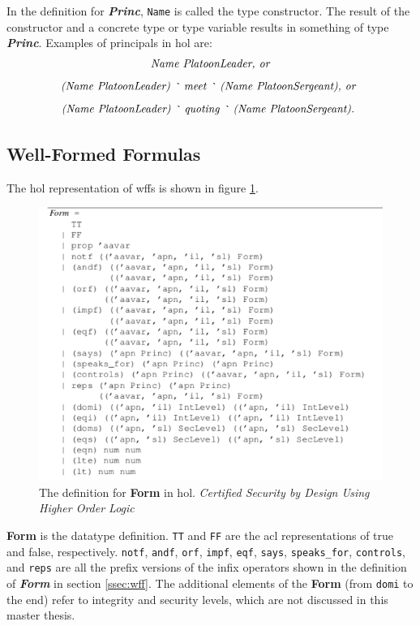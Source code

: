 \documentclass[../../main/main.tex]{subfiles}
\begin{document}
In the definition for  \textbf{\textit{Princ}}, \texttt{Name} is called the type constructor.  The result of the constructor and a concrete type or type variable results in something of type \textbf{\textit{Princ}}.  Examples of principals in \gls{hol} are:
\[\text{\textit{Name PlatoonLeader, or}} \]
\[\text{\textit{(Name PlatoonLeader) \texttt{\textasciigrave} meet \texttt{\textasciigrave} (Name PlatoonSergeant), or }}\]
\[\text{\textit{(Name PlatoonLeader) \texttt{\textasciigrave} quoting \texttt{\textasciigrave} (Name PlatoonSergeant).} }\]

\subsection{Well-Formed Formulas}
The \gls{hol} representation of \gls{wff}s is shown in figure \ref{FormACL}.

\begin{figure}[h]
\centering
\includegraphics[width=\textwidth]{../figures/FormACL}
\caption{\label{FormACL}The definition for \textbf{Form} in \gls{hol}.   \textit{Certified Security by Design Using Higher Order Logic}\cite{certmanual}}
\end{figure}

\textbf{Form} is the datatype definition.  \texttt{TT}  and \texttt{FF} are the \gls{acl} representations of true and false, respectively.  \texttt{notf}, \texttt{andf}, \texttt{orf}, \texttt{impf}, \texttt{eqf}, \texttt{says}, \texttt{speaks_for}, \texttt{controls}, and \texttt{reps} are all the prefix versions of the infix operators shown in the definition of \textbf{\textit{Form}} in section \ref{ssec:wff}.  The additional elements of the \textbf{Form} (from \texttt{domi} to the end) refer to integrity and security levels, which are not discussed in this master thesis. 
\end{document}
